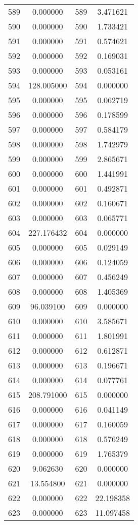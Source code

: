 \documentclass[12pt]{article}
\begin{document}
\begin{longtable}{@{}cccc@{}}
589 & 0.000000 & 589 & 3.471621 \\
590 & 0.000000 & 590 & 1.733421 \\
591 & 0.000000 & 591 & 0.574621 \\
592 & 0.000000 & 592 & 0.169031 \\
593 & 0.000000 & 593 & 0.053161 \\
594 & 128.005000 & 594 & 0.000000 \\
595 & 0.000000 & 595 & 0.062719 \\
596 & 0.000000 & 596 & 0.178599 \\
597 & 0.000000 & 597 & 0.584179 \\
598 & 0.000000 & 598 & 1.742979 \\
599 & 0.000000 & 599 & 2.865671 \\
600 & 0.000000 & 600 & 1.441991 \\
601 & 0.000000 & 601 & 0.492871 \\
602 & 0.000000 & 602 & 0.160671 \\
603 & 0.000000 & 603 & 0.065771 \\
604 & 227.176432 & 604 & 0.000000 \\
605 & 0.000000 & 605 & 0.029149 \\
606 & 0.000000 & 606 & 0.124059 \\
607 & 0.000000 & 607 & 0.456249 \\
608 & 0.000000 & 608 & 1.405369 \\
609 & 96.039100 & 609 & 0.000000 \\
610 & 0.000000 & 610 & 3.585671 \\
611 & 0.000000 & 611 & 1.801991 \\
612 & 0.000000 & 612 & 0.612871 \\
613 & 0.000000 & 613 & 0.196671 \\
614 & 0.000000 & 614 & 0.077761 \\
615 & 208.791000 & 615 & 0.000000 \\
616 & 0.000000 & 616 & 0.041149 \\
617 & 0.000000 & 617 & 0.160059 \\
618 & 0.000000 & 618 & 0.576249 \\
619 & 0.000000 & 619 & 1.765379 \\
620 & 9.062630 & 620 & 0.000000 \\
621 & 13.554800 & 621 & 0.000000 \\
622 & 0.000000 & 622 & 22.198358 \\
623 & 0.000000 & 623 & 11.097458 \\

\end{longtable}
\end{document}
